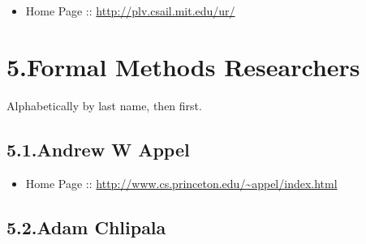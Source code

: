 \documentclass[12pt,twoside]{article}
\begin{document}
\begin{itemize}[noitemsep,topsep=\mdcompacttopsep]%

\item{}Home Page :: \href{http://plv.csail.mit.edu/ur/}{{\ttfamily http://\hspace{0pt}plv.\hspace{0pt}csail.\hspace{0pt}mit.\hspace{0pt}edu/\hspace{0pt}ur/\hspace{0pt}}}%
\end{itemize}%

\section{5.\hspace*{0.5em}Formal Methods Researchers}\label{sec-formal-methods-researchers}%

\noindent{}Alphabetically by last name, then first.%

\subsection{5.1.\hspace*{0.5em}Andrew W Appel}\label{sec-andrew-w-appel}%

\begin{itemize}[noitemsep,topsep=\mdcompacttopsep]%

\item{}Home Page :: \href{http://www.cs.princeton.edu/~appel/index.html}{{\ttfamily http://\hspace{0pt}www.\hspace{0pt}cs.\hspace{0pt}princeton.\hspace{0pt}edu/\hspace{0pt}\textasciitilde{}appel/\hspace{0pt}index.\hspace{0pt}html}}%
\end{itemize}%

\subsection{5.2.\hspace*{0.5em}Adam Chlipala}\label{sec-adam-chlipala}%
\end{document}
